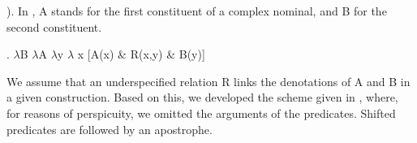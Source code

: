 \documentclass[a4paper,12pt,oneside]{book}
\begin{document}
). In \Next, A stands for the first  constituent of a complex
nominal, and B for the second constituent. 

\ex. \label{ex:underspecified}
$\lambda$B $\lambda$A $\lambda$y $\lambda$ x [A(x) \& R(x,y)
\& B(y)]

We assume that an underspecified relation R links the denotations of A
and B in a given construction.
Based on this, we developed the scheme given in , where, for reasons
of perspicuity, we omitted the arguments of the predicates. Shifted
predicates are followed by an apostrophe.
\end{document}
